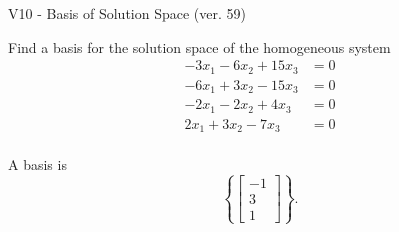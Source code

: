 \begin{exercise}
  \begin{exerciseTitle}V10 - Basis of Solution Space (ver. 59)\end{exerciseTitle}
  \begin{exerciseStatement}
    Find a basis for the solution space of the homogeneous system 
\begin{align*}
 -3 x_ 1 -6 x_ 2 + 15 x_ 3 &= 0  \\ 
  -6 x_ 1 + 3 x_ 2 -15 x_ 3 &= 0  \\ 
  -2 x_ 1 -2 x_ 2 + 4 x_ 3 &= 0  \\ 
  2 x_ 1 + 3 x_ 2 -7 x_ 3 &= 0  \\ 
 \end{align*}


 
  \end{exerciseStatement}

  \begin{exerciseAnswer}
   A basis is   
\[\left\{\left[\begin{array}{c}
-1 \\
3 \\
1
\end{array}\right]\right\}.\]

  


  \end{exerciseAnswer}
\end{exercise}